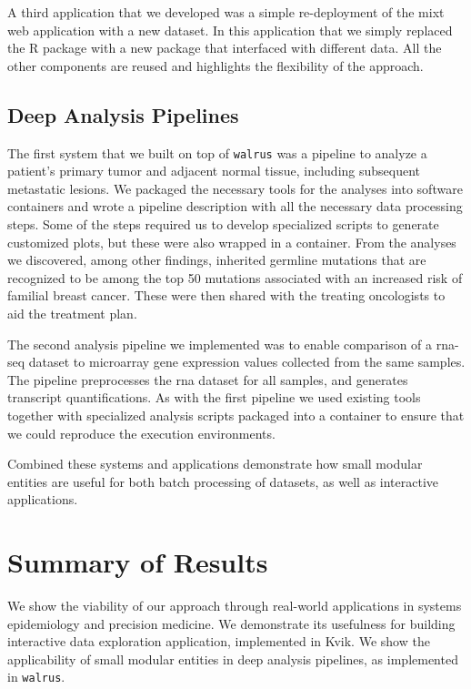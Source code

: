 A third application that we developed was a simple re-deployment of the
\gls{mixt} web application with a new dataset. In this application that we
simply replaced the R package with a new package that interfaced with different
data. All the other components are reused and highlights the flexibility of the
approach. 


\subsection{Deep Analysis Pipelines}
The first system that we built on top of \texttt{walrus} was a pipeline to
analyze a patient’s primary tumor and adjacent normal tissue, including
subsequent metastatic lesions.\cite{walrus} We packaged the necessary tools for
the analyses into software containers and wrote a pipeline description with all
the necessary data processing steps. Some of the steps required us to develop
specialized scripts to generate customized plots, but these were also wrapped in
a container. From the analyses we discovered, among other findings, inherited
germline mutations that are recognized to be among the top 50 mutations
associated with an increased risk of familial breast cancer. These were then
shared with the treating oncologists to aid the treatment plan. 

The second analysis pipeline we implemented was to enable comparison of a
\gls{rna}-seq dataset to microarray gene expression values collected from the
same samples.  The pipeline preprocesses the \gls{rna} dataset for all samples,
and generates transcript quantifications. As with the first pipeline we used
existing tools together with specialized analysis scripts packaged into a
container to ensure that we could reproduce the execution environments. 

Combined these systems and applications demonstrate how small modular entities
are useful for both batch processing of datasets, as well as interactive
applications. 

\section{Summary of Results} 
We show the viability of our approach through real-world applications in systems
epidemiology and precision medicine. We demonstrate its usefulness for building
interactive data exploration application, implemented in Kvik. We show the
applicability of small modular entities in deep analysis pipelines, as
implemented in \texttt{walrus}.

